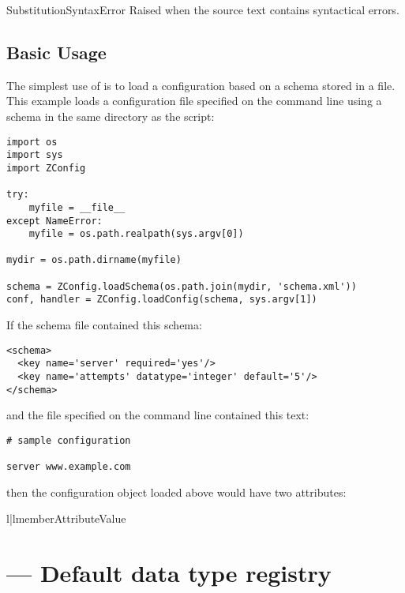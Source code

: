 \documentclass{howto}
\begin{document}
\begin{excdesc}{SubstitutionSyntaxError}
  Raised when the source text contains syntactical errors.
\end{excdesc}


\subsection{Basic Usage}

The simplest use of  is to load a configuration
based on a schema stored in a file.  This example loads a
configuration file specified on the command line using a schema in the
same directory as the script:

\begin{verbatim}
import os
import sys
import ZConfig

try:
    myfile = __file__
except NameError:
    myfile = os.path.realpath(sys.argv[0])

mydir = os.path.dirname(myfile)

schema = ZConfig.loadSchema(os.path.join(mydir, 'schema.xml'))
conf, handler = ZConfig.loadConfig(schema, sys.argv[1])
\end{verbatim}

If the schema file contained this schema:

\begin{verbatim}
<schema>
  <key name='server' required='yes'/>
  <key name='attempts' datatype='integer' default='5'/>
</schema>
\end{verbatim}

and the file specified on the command line contained this text:

\begin{verbatim}
# sample configuration

server www.example.com
\end{verbatim}

then the configuration object  loaded above would have two
attributes:

\begin{tableii}{l|l}{member}{Attribute}{Value}
\end{tableii}


\section{ --- Default data type registry}
\end{document}

